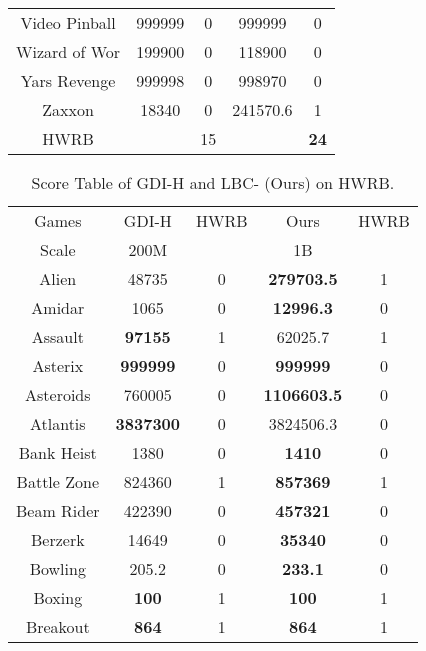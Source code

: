 \begin{table}[!hb]
\begin{center}
\begin{tabular}{c cc cc }
        Video Pinball & 999999 & 0  & 999999 & 0  \\  
        Wizard of Wor & 199900 & 0  & 118900 & 0  \\  
        Yars Revenge & 999998 & 0  & 998970 & 0  \\  
        Zaxxon & 18340 & 0  & 241570.6 & 1 \\ 
        \midrule
          HWRB & & 15& & \textbf{24}  \\ 
         \bottomrule
\end{tabular}
\end{center}
\end{table}

\clearpage



\begin{table}[!hb]
\footnotesize
\begin{center}
\caption{Score Table of GDI-H and LBC- (Ours) on HWRB.}
\label{Tab:Score table of GDI and LBC on HWRB.}
\setlength{\tabcolsep}{1.0pt}
\begin{tabular}{c cc cc }
\toprule
Games & GDI-H & HWRB & Ours &HWRB   \\ 
        Scale & 200M & ~ & 1B &    \\  \midrule
        Alien & 48735	             & 0 & \textbf{279703.5} & 1 \\  
        Amidar &1065              & 0 & \textbf{12996.3} & 0 \\  
        Assault &\textbf{97155}	             & 1  & 62025.7 & 1 \\  
        Asterix &\textbf{{999999}}   & 0 & \textbf{999999} & 0 \\  
        Asteroids &{760005}            & 0 & \textbf{1106603.5} & 0 \\  
        Atlantis &\textbf{{3837300}}           & 0   & 3824506.3 & 0 \\  
        Bank Heist &1380              & 0  & \textbf{1410} & 0 \\   
        Battle Zone &824360            & 1 & \textbf{857369} & 1 \\  
        Beam Rider &422390            & 0 & \textbf{457321} & 0 \\  
        Berzerk &14649             & 0 & \textbf{35340} & 0 \\    
        Bowling &205.2             & 0 & \textbf{233.1} & 0 \\  
        Boxing &\textbf{{100}}      & 1  & \textbf{100} &1 \\  
        Breakout &\textbf{{864}}     & 1& \textbf{864} & 1 \\   

\end{tabular}
\end{center}
\end{table}
